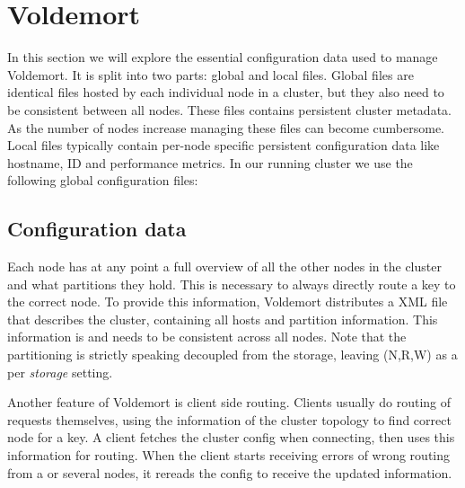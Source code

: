 

\section{Voldemort}
\label{sec:voldemort}
In this section we will explore the essential configuration data used to manage Voldemort. It is split into two parts: global and local files. Global files are identical files hosted by each individual node in a cluster, but they also need to be consistent between all nodes. These files contains persistent cluster metadata. As the number of nodes increase managing these files can become cumbersome. Local files typically contain per-node specific persistent configuration data like hostname, ID and performance metrics. In our running cluster we use the following global configuration files:

\subsection{Configuration data}
Each node has at any point a full overview of all the other nodes in the cluster and what partitions they hold. This is necessary to always directly route a key to the correct node.
To provide this information, Voldemort distributes a XML file that describes the cluster, containing all hosts and partition information. This information is and needs to be consistent across all nodes.
Note that the partitioning is strictly speaking decoupled from the storage, leaving (N,R,W) as a per \emph{storage} setting.

Another feature of Voldemort is client side routing. Clients usually do routing of requests themselves, using the information of the cluster topology to find correct node for a key. A client fetches the cluster config when connecting, then uses this information for routing. When the client starts receiving errors of wrong routing from a or several nodes, it rereads the config to receive the updated information.

